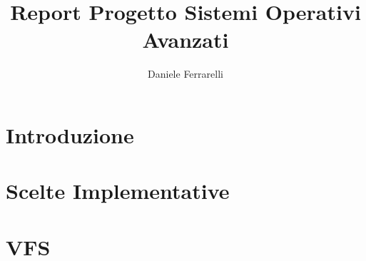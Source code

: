 \documentclass[a4paper,10pt]{article}
\title{Report Progetto Sistemi Operativi Avanzati}
\author{Daniele Ferrarelli}
\date{}
\begin{document}
\maketitle

\section{Introduzione}
\section{Scelte Implementative}
\section{VFS}
\end{document}
